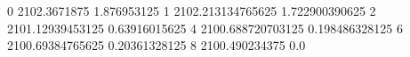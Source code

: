 0 2102.3671875 1.876953125
1 2102.213134765625 1.722900390625
2 2101.12939453125 0.63916015625
4 2100.688720703125 0.198486328125
6 2100.69384765625 0.20361328125
8 2100.490234375 0.0
